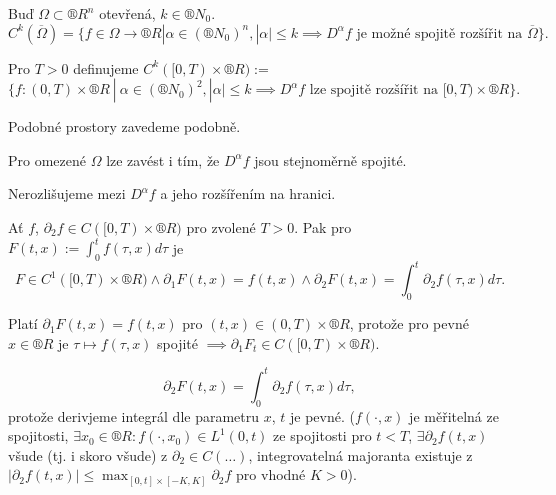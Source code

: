 \documentclass[12pt]{article}					%
\begin{document}
\begin{definice}
	Buď $\Omega \subset ®R^n$ otevřená, $k \in ®N_0$.
	$$ C^k(\overline{\Omega}) = \{f \in \Omega \rightarrow ®R | \alpha \in (®N_0)^n, |\alpha| ≤ k \implies D^\alpha f \text{ je možné spojitě rozšířit na } \overline{\Omega}\}. $$

	Pro $T > 0$ definujeme $C^k([0, T) \times ®R) :=$
	$$ \{f:(0, T) \times ®R\ |\ \alpha \in (®N_0)^2, |\alpha| ≤ k \implies D^\alpha f \text{ lze spojitě rozšířit na } [0, T)\times ®R\}. $$

	\begin{poznamkain}
		Podobné prostory zavedeme podobně.

		Pro omezené $\Omega$ lze zavést i tím, že $D^\alpha f$ jsou stejnoměrně spojité.

		Nerozlišujeme mezi $D^\alpha f$ a jeho rozšířením na hranici.
	\end{poznamkain}
\end{definice}

\begin{lemma}
	Ať $f$, $\partial_2 f \in C([0, T) \times ®R)$ pro zvolené $T > 0$. Pak pro $F(t, x) := \int_0^t f(\tau, x) d\tau$ je
	$$ F \in C^1([0, T) \times ®R) \land \partial_1 F(t, x) = f(t, x) \land \partial_2 F(t, x) = \int_0^t \partial_2 f(\tau, x) d\tau. $$

	\begin{dukazin}[Náznak]
		Platí $\partial_1 F(t, x) = f(t, x)$ pro $(t, x) \in (0, T) \times ®R$, protože pro pevné $x \in ®R$ je $\tau \mapsto f(\tau, x)$ spojité $\implies \partial_1 F_t \in C([0, T) \times ®R)$.

		$$ \partial_2 F(t, x) = \int_0^t \partial_2 f(\tau, x) d\tau, $$
		protože derivjeme integrál dle parametru $x$, $t$ je pevné. ($f(·, x)$ je měřitelná ze spojitosti, $\exists x_0 \in ®R: f(·, x_0) \in L^1(0, t)$ ze spojitosti pro $t < T$, $\exists \partial_2 f(t, x)$ všude (tj. i skoro všude) z $\partial_2 \in C(…)$, integrovatelná majoranta existuje z $|\partial_2 f(t, x)| ≤ \max_{[0, t] \times [-K, K]} \partial_2 f$ pro vhodné $K > 0$).
	\end{dukazin}
\end{lemma}
\end{document}

